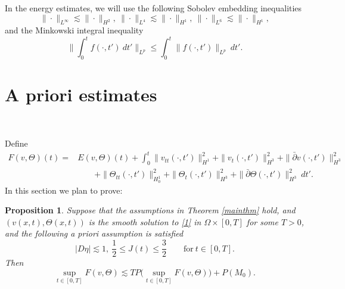 \documentclass[12pt,a4paper]{amsart}
\numberwithin{equation}{section}
\theoremstyle{plain}
\newtheorem{Prop}[Thm]{Proposition}
\theoremstyle{definition}
\newcommand{\bpartial}{\bar{\partial}}
\begin{document}
In the energy estimates, we will use the following Sobolev embedding inequalities
\begin{equation}
\|\cdot\|_{L^{\infty}}\lesssim \|\cdot\|_{H^2},\ \|\cdot\|_{L^4}\lesssim  \|\cdot\|_{H^1},\ \|\cdot\|_{L^6}\lesssim  \|\cdot\|_{H^1},
\end{equation}
and the Minkowski integral inequality
\begin{equation}
\Big\|\int_{0}^{t} f(\cdot,t') \ dt'\Big\|_{L^p}\leq \int_{0}^{t} \|f(\cdot,t')\|_{L^p}\ dt'.
\end{equation}







\vspace{0.7cm}
\section{A priori estimates}~

Define
\begin{equation}
\begin{aligned}
F(v,\Theta)(t)=&E(v,\Theta)(t)+\int_{0}^{t} \|v_{tt}(\cdot,t')\|_{H^1}^2+\|v_t(\cdot,t')\|_{H^3}^2+\|\bpartial v(\cdot,t')\|_{H^3}^2
\\
&\qquad+\|\Theta_{tt}(\cdot,t')\|_{H_0^1}^2+\|\Theta_t(\cdot,t')\|_{H^3}^2+\|\bpartial \Theta(\cdot,t')\|_{H^3}^2\ dt'.
\end{aligned}
\end{equation}
In this section we plan to prove:
\begin{Prop}\label{prop-of-estimates}
	Suppose that the assumptions in Theorem \ref{mainthm} hold, and $(v(x,t),\Theta(x,t))$ is the smooth solution to \eqref{1} in $\Omega\times[0,T]$ for some $T>0$, and the following a priori assumption is satisfied
	\begin{equation}
	\label{a priori assumption}
	|D\eta|\lesssim 1,\
	\frac{1}{2}\leq J(t)\leq \frac{3}{2} \qquad \text{for}\ t\in[0,T].
	\end{equation}
	Then 
    \begin{equation}
    \label{a priori estimates}
    \sup\limits_{t\in[0,T]}F(v,\Theta)\lesssim  TP\Big(\sup\limits_{t\in[0,T]}F(v,\Theta)\Big)+P(M_0).
    \end{equation}
\end{Prop}
\end{document}
